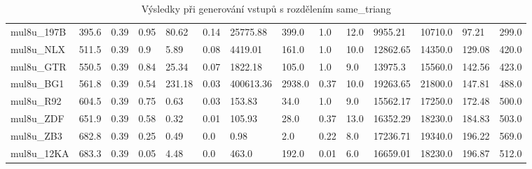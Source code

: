 \begin{landscape}
\begin{table}[!ht]
{\begin{tabular}{|l|l|l|l|l|l|l|l|l|l|l|l|l|l|}
        mul8u\_197B & 395.6 & 0.39 & 0.95 & 80.62 & 0.14 & 25775.88 & 399.0 & 1.0 & 12.0 & 9955.21 & 10710.0 & 97.21 & 299.0 \\ 
        mul8u\_NLX & 511.5 & 0.39 & 0.9 & 5.89 & 0.08 & 4419.01 & 161.0 & 1.0 & 10.0 & 12862.65 & 14350.0 & 129.08 & 420.0 \\ 
        mul8u\_GTR & 550.5 & 0.39 & 0.84 & 25.34 & 0.07 & 1822.18 & 105.0 & 1.0 & 9.0 & 13975.3 & 15560.0 & 142.56 & 423.0 \\ 
        mul8u\_BG1 & 561.8 & 0.39 & 0.54 & 231.18 & 0.03 & 400613.36 & 2938.0 & 0.37 & 10.0 & 19263.65 & 21800.0 & 147.81 & 488.0 \\ 
        mul8u\_R92 & 604.5 & 0.39 & 0.75 & 0.63 & 0.03 & 153.83 & 34.0 & 1.0 & 9.0 & 15562.17 & 17250.0 & 172.48 & 500.0 \\ 
        mul8u\_ZDF & 651.9 & 0.39 & 0.58 & 0.32 & 0.01 & 105.93 & 28.0 & 0.37 & 13.0 & 16352.29 & 18230.0 & 184.83 & 503.0 \\ 
        mul8u\_ZB3 & 682.8 & 0.39 & 0.25 & 0.49 & 0.0 & 0.98 & 2.0 & 0.22 & 8.0 & 17236.71 & 19340.0 & 196.22 & 569.0 \\ 
        mul8u\_12KA & 683.3 & 0.39 & 0.05 & 4.48 & 0.0 & 463.0 & 192.0 & 0.01 & 6.0 & 16659.01 & 18230.0 & 196.87 & 512.0 \\ 
    \end{tabular}}
    \caption{Výsledky při generování vstupů s rozdělením same\_triang}
    \label{same_triang}
\end{table}


\end{landscape}
